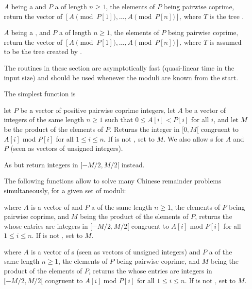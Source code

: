  $A$ being a 
and $P$ a  of length $n\ge 1$, the elements of $P$ being
pairwise coprime, return the vector of 
$[A \pmod{P[1]},\ldots,A \pmod{P[n]}]$,
where $T$ is the tree .

 $A$ being a ,
and $P$ a  of length $n\ge 1$, the elements of $P$ being
pairwise coprime, return the vector of 
$[A \pmod{P[1]},\ldots,A \pmod{P[n]}]$,
where $T$ is assumed to be the tree created by .

\medskip

The routines in these section are asymptotically fast (quasi-linear time in
the input size) and should be used whenever the moduli are known from
the start.

The simplest function is

let $P$ be a vector of positive pairwise coprime integers, let $A$ be a
vector of integers of the same length $n\ge 1$ such that $0 \leq A[i] < P[i]$
for all $i$, and let $M$ be the product of the elements of $P$. Returns the
integer in $[0, M[$ congruent to $A[i]$ mod $P[i]$ for all $1\leq i\leq n$.
If  is not , set  to $M$. We also allow
s for $A$ and $P$ (seen as vectors of unsigned integers).

As  but return integers in $[-M/2, M/2[$ instead.

The following functions allow to solve many Chinese remainder problems
simultaneously, for a given set of moduli:

where $A$ is a vector of 
and $P$ a  of the same length $n\ge 1$, the elements of $P$
being pairwise coprime, and $M$ being the product of the elements of $P$,
returns the  whose entries are integers in $[-M/2, M/2[$ congruent to $A[i]$
mod $P[i]$ for all $1\leq i\leq n$.
If  is not , set  to $M$.

 where $A$ is a
vector of s (seen as vectors of unsigned integers) and $P$ a
 of the same length $n\ge 1$, the elements of $P$ being
pairwise coprime, and $M$ being the product of the elements of $P$, returns
the  whose entries are integers in $[-M/2, M/2[$ congruent to $A[i]$
mod $P[i]$ for all $1\leq i\leq n$. If  is not , set
 to $M$.

